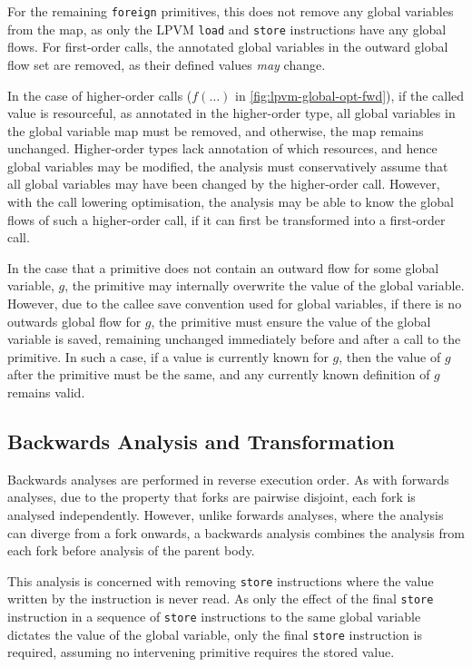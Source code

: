 For the remaining \texttt{foreign} primitives, this does not remove any global variables from the map, as only the LPVM \texttt{load} and \texttt{store} instructions have any global flows. For first-order calls, the annotated global variables in the outward global flow set are removed, as their defined values \textit{may} change. 

In the case of higher-order calls ($f(\dots)$ in \cref{fig:lpvm-global-opt-fwd}), if the called value is resourceful, as annotated in the higher-order type, all global variables in the global variable map must be removed, and otherwise, the map remains unchanged. Higher-order types lack annotation of which resources, and hence global variables may be modified, the analysis must conservatively assume that all global variables may have been changed by the higher-order call. However, with the call lowering optimisation, the analysis may be able to know the global flows of such a higher-order call, if it can first be transformed into a first-order call.

In the case that a primitive does not contain an outward flow for some global variable, $g$, the primitive may internally overwrite the value of the global variable. However, due to the callee save convention used for global variables, if there is no outwards global flow for $g$, the primitive must ensure the value of the global variable is saved, remaining unchanged immediately before and after a call to the primitive. In such a case, if a value is currently known for $g$, then the value of $g$ after the primitive must be the same, and any currently known definition of $g$ remains valid.

\subsection{Backwards Analysis and Transformation}
\label{ssec:global-opt-bwd}

Backwards analyses are performed in reverse execution order. As with forwards analyses, due to the property that forks are pairwise disjoint, each fork is analysed independently. However, unlike forwards analyses, where the analysis can diverge from a fork onwards, a backwards analysis combines the analysis from each fork before analysis of the parent body.

This analysis is concerned with removing \texttt{store} instructions where the value written by the instruction is never read. As only the effect of the final \texttt{store} instruction in a sequence of \texttt{store} instructions to the same global variable dictates the value of the global variable, only the final \texttt{store} instruction is required, assuming no intervening primitive requires the stored value. 

